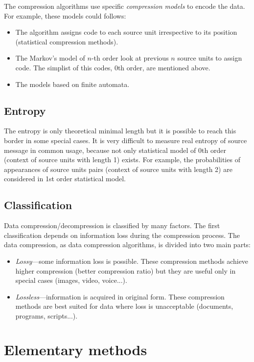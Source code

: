\documentclass[thesis=M,english]{FITthesis}[2012/10/20]
\begin{document}
The compression algorithms use specific \textit{compression models} to encode the data. For example, these models could follows:
\begin{itemize}
	\item The algorithm assigns code to each source unit irrespective to its position (statistical compression methods).
	\item The Markov's model of $n$-th order look at previous $n$ source units to assign code. The simplist of this codes, 0th order, are mentioned above.
	\item The models based on finite automata.
\end{itemize}

	\subsection{Entropy}
The entropy is only theoretical minimal length but it is possible to reach this border in some special cases. It is very difficult to measure real entropy of source message in common usage, because not only statistical model of 0th order (context of source units with length 1) exists. For example, the probabilities of appearances of source units pairs (context of source units with length 2) are considered in 1st order statistical model.

	\subsection{Classification}

Data compression/decompression is classified by many factors. The first classification depends on information loss during the compression process. The data compression, as data compression algorithms, is divided into two main parts:
\begin{itemize}
	\item \textit{Lossy}---some information loss is possible. These compression methods achieve higher compression (better compression ratio) but they are useful only in special cases (images, video, voice...).
	\item \textit{Lossless}---information is acquired in original form. These compression methods are best suited for data where loss is unacceptable (documents, programs, scripts...).
\end{itemize}

\section{Elementary methods}
\end{document}
